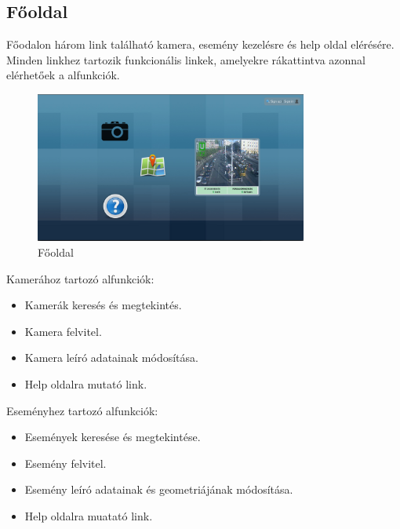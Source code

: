 \subsection{Főoldal} %
\label{sub:főoldal}
Főodalon három link található kamera, esemény kezelésre és help oldal elérésére. Minden linkhez tartozik funkcionális linkek, amelyekre rákattintva azonnal elérhetőek a alfunkciók.

\begin{figure}[h!]
  \centering
  \includegraphics[width=0.8\textwidth]{chapters/chap4/main.png}
  \caption{Főoldal}
\end{figure}

Kamerához tartozó alfunkciók:
\begin{itemize}
  \item Kamerák keresés és megtekintés.
  \item Kamera felvitel.
  \item Kamera leíró adatainak módosítása.
  \item Help oldalra mutató link.
\end{itemize}

Eseményhez tartozó alfunkciók:
\begin{itemize}
  \item Események keresése és megtekintése.
  \item Esemény felvitel.
  \item Esemény leíró adatainak és geometriájának módosítása.
  \item Help oldalra muatató link.
\end{itemize}


